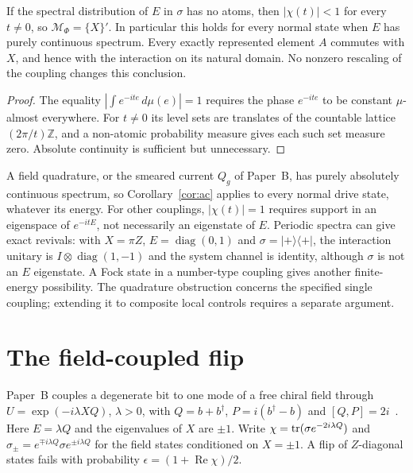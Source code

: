 \begin{corollary}
\label{cor:ac}
If the spectral distribution of $E$ in $\sigma$ has no atoms, then $|\chi(t)|<1$ for every $t\neq0$, so $\mathcal M_\Phi=\{X\}'$. In particular this holds for every normal state when $E$ has purely continuous spectrum. Every exactly represented element $A$ commutes with $X$, and hence with the interaction on its natural domain. No nonzero rescaling of the coupling changes this conclusion.
\end{corollary}

\begin{proof}
The equality $|\int e^{-ite}\,d\mu(e)|=1$ requires the phase $e^{-ite}$ to be constant $\mu$-almost everywhere. For $t\ne0$ its level sets are translates of the countable lattice $(2\pi/t)\mathbb Z$, and a non-atomic probability measure gives each such set measure zero. Absolute continuity is sufficient but unnecessary.
\end{proof}

A field quadrature, or the smeared current $Q_g$ of Paper~B, has purely absolutely continuous spectrum, so Corollary~\ref{cor:ac} applies to every normal drive state, whatever its energy. For other couplings, $|\chi(t)|=1$ requires support in an eigenspace of $e^{-itE}$, not necessarily an eigenstate of $E$. Periodic spectra can give exact revivals: with $X=\pi Z$, $E=\operatorname{diag}(0,1)$ and $\sigma=|+\rangle\langle+|$, the interaction unitary is $I\otimes\operatorname{diag}(1,-1)$ and the system channel is identity, although $\sigma$ is not an $E$ eigenstate. A Fock state in a number-type coupling gives another finite-energy possibility. The quadrature obstruction concerns the specified single coupling; extending it to composite local controls requires a separate argument.

\section{The field-coupled flip}
\label{sec:flip}

Paper~B couples a degenerate bit to one mode of a free chiral field through $U=\exp(-i\lambda XQ)$, $\lambda>0$, with $Q=b+b^\dagger$, $P=i(b^\dagger-b)$ and $[Q,P]=2i$~\cite{Liu2026QRAIF_B}. Here $E=\lambda Q$ and the eigenvalues of $X$ are $\pm1$. Write $\chi=\operatorname{tr}(\sigma e^{-2i\lambda Q})$ and $\sigma_\pm=e^{\mp i\lambda Q}\sigma e^{\pm i\lambda Q}$ for the field states conditioned on $X=\pm1$. A flip of $Z$-diagonal states fails with probability $\epsilon=(1+\operatorname{Re}\chi)/2$.

